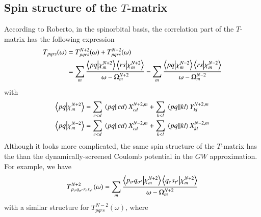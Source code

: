 \documentclass[aip,jcp,reprint,noshowkeys,superscriptaddress]{revtex4-1}
\newcommand{\sig}{\sigma}
\newcommand{\sigp}{{\sigma'}}
\newcommand{\taup}{{\tau'}}
\begin{document}
\subsection{Spin structure of the $T$-matrix}
According to Roberto, in the spinorbital basis, the correlation part of the $T$-matrix has the following expression
\begin{equation}
\begin{split}
	T_{pqrs}(\omega) 
		& = T_{pqrs}^{N+2}(\omega) + T_{pqrs}^{N-2}(\omega) 
		\\
		& = \sum_{m} \frac{\braket{pq}{\chi_m^{N+2}}\braket{rs}{\chi_m^{N+2}}}{\omega  - \Omega_m^{N+2}}
		- \sum_{m} \frac{\braket{pq}{\chi_m^{N-2}}\braket{rs}{\chi_m^{N-2}}}{\omega  - \Omega_m^{N-2}}
\end{split}
\end{equation}
with
\begin{align}
	\braket{pq}{\chi_m^{N+2}} & = \sum_{c < d} \mel{pq}{}{cd} X_{cd}^{N+2,m} + \sum_{k < l}  \mel{pq}{}{kl} Y_{kl}^{N+2,m}
	\\
	\braket{pq}{\chi_m^{N-2}} & = \sum_{c < d} \mel{pq}{}{cd} X_{cd}^{N-2,m} + \sum_{k < l}  \mel{pq}{}{kl} X_{kl}^{N-2,m}
\end{align}
Although it looks more complicated, the same spin structure of the $T$-matrix has the than the dynamically-screened Coulomb potential in the $GW$ approximation.
For example, we have
\begin{equation}
\begin{split}
	T_{p_\sig q_\sigp r_\tau s_\taup}^{N+2}(\omega) 
		= \sum_{m} \frac{\braket{p_\sig q_\sigp}{\chi_m^{N+2}}\braket{q_\tau s_\taup}{\chi_m^{N+2}}}{\omega  - \Omega_m^{N+2}}
\end{split}
\end{equation}
with a similar structure for $T_{pqrs}^{N-2}(\omega)$, where
\end{document}
